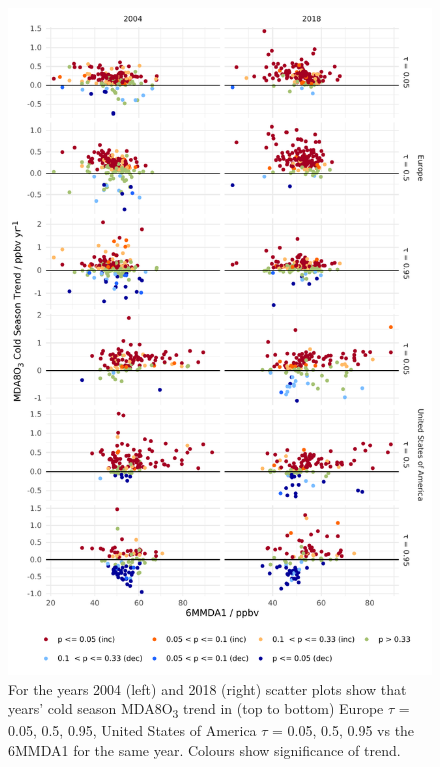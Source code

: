 \documentclass{article}
\begin{document}
\begin{figure}[p]
\centering
\includegraphics[height=0.75\textheight]{figures/si_figures/fS24_mda8_cold_sig_mda8_6mmda1.pdf}
\caption{For the years 2004 (left) and 2018 (right) scatter plots show that years' cold season MDA8O\textsubscript{3} trend in (top to bottom) Europe $\tau$ = 0.05, 0.5, 0.95, United States of America $\tau$ = 0.05, 0.5, 0.95 vs the 6MMDA1 for the same year. Colours show significance of trend.}
\label{si_fig:mda8_cold_sig_mda8_6mmda1}
\end{figure}
\clearpage




\clearpage


\end{document}
